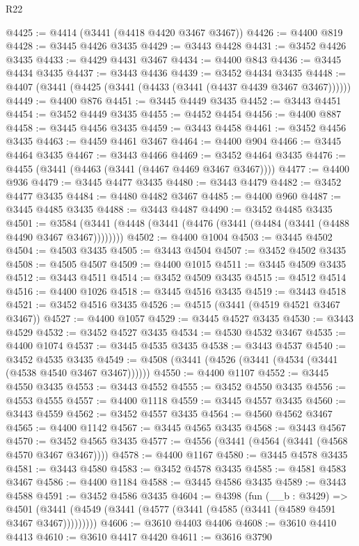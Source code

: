 \begin{lexlean}{R22}
\begin{coremodule}
@4425 := @4414 (@3441 (@4418 @4420 @3467 @3467))
@4426 := @4400 @819
@4428 := @3445 @4426 @3435
@4429 := @3443 @4428
@4431 := @3452 @4426 @3435
@4433 := @4429 @4431 @3467
@4434 := @4400 @843
@4436 := @3445 @4434 @3435
@4437 := @3443 @4436
@4439 := @3452 @4434 @3435
@4448 := @4407 (@3441 (@4425 (@3441 (@4433 (@3441 (@4437 @4439 @3467 @3467))))))
@4449 := @4400 @876
@4451 := @3445 @4449 @3435
@4452 := @3443 @4451
@4454 := @3452 @4449 @3435
@4455 := @4452 @4454
@4456 := @4400 @887
@4458 := @3445 @4456 @3435
@4459 := @3443 @4458
@4461 := @3452 @4456 @3435
@4463 := @4459 @4461 @3467
@4464 := @4400 @904
@4466 := @3445 @4464 @3435
@4467 := @3443 @4466
@4469 := @3452 @4464 @3435
@4476 := @4455 (@3441 (@4463 (@3441 (@4467 @4469 @3467 @3467))))
@4477 := @4400 @936
@4479 := @3445 @4477 @3435
@4480 := @3443 @4479
@4482 := @3452 @4477 @3435
@4484 := @4480 @4482 @3467
@4485 := @4400 @960
@4487 := @3445 @4485 @3435
@4488 := @3443 @4487
@4490 := @3452 @4485 @3435
@4501 := @3584 (@3441 (@4448 (@3441 (@4476 (@3441 (@4484 (@3441 (@4488 @4490 @3467 @3467))))))))
@4502 := @4400 @1004
@4503 := @3445 @4502
@4504 := @4503 @3435
@4505 := @3443 @4504
@4507 := @3452 @4502 @3435
@4508 := @4505 @4507
@4509 := @4400 @1015
@4511 := @3445 @4509 @3435
@4512 := @3443 @4511
@4514 := @3452 @4509 @3435
@4515 := @4512 @4514
@4516 := @4400 @1026
@4518 := @3445 @4516 @3435
@4519 := @3443 @4518
@4521 := @3452 @4516 @3435
@4526 := @4515 (@3441 (@4519 @4521 @3467 @3467))
@4527 := @4400 @1057
@4529 := @3445 @4527 @3435
@4530 := @3443 @4529
@4532 := @3452 @4527 @3435
@4534 := @4530 @4532 @3467
@4535 := @4400 @1074
@4537 := @3445 @4535 @3435
@4538 := @3443 @4537
@4540 := @3452 @4535 @3435
@4549 := @4508 (@3441 (@4526 (@3441 (@4534 (@3441 (@4538 @4540 @3467 @3467))))))
@4550 := @4400 @1107
@4552 := @3445 @4550 @3435
@4553 := @3443 @4552
@4555 := @3452 @4550 @3435
@4556 := @4553 @4555
@4557 := @4400 @1118
@4559 := @3445 @4557 @3435
@4560 := @3443 @4559
@4562 := @3452 @4557 @3435
@4564 := @4560 @4562 @3467
@4565 := @4400 @1142
@4567 := @3445 @4565 @3435
@4568 := @3443 @4567
@4570 := @3452 @4565 @3435
@4577 := @4556 (@3441 (@4564 (@3441 (@4568 @4570 @3467 @3467))))
@4578 := @4400 @1167
@4580 := @3445 @4578 @3435
@4581 := @3443 @4580
@4583 := @3452 @4578 @3435
@4585 := @4581 @4583 @3467
@4586 := @4400 @1184
@4588 := @3445 @4586 @3435
@4589 := @3443 @4588
@4591 := @3452 @4586 @3435
@4604 := @4398
    (fun (__b : @3429) =>
    @4501 (@3441 (@4549 (@3441 (@4577 (@3441 (@4585 (@3441 (@4589 @4591 @3467 @3467)))))))))
@4606 := @3610 @4403 @4406
@4608 := @3610 @4410 @4413
@4610 := @3610 @4417 @4420
@4611 := @3616 @3790

\end{coremodule}
\end{lexlean}
